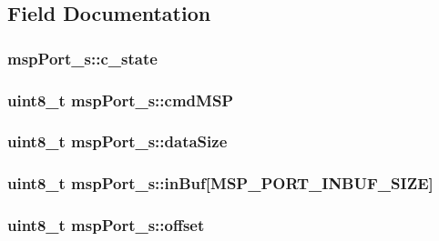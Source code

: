 \subsection{Field Documentation}
\hypertarget{structmspPort__s_aec5dc10b05ca82165f879c4191bd38a0}{
\subsubsection[{c\+\_\+state}]{ msp\+Port\+\_\+s\+::c\+\_\+state}}\label{structmspPort__s_aec5dc10b05ca82165f879c4191bd38a0}
\hypertarget{structmspPort__s_a8ab638ef0b8106954eaaad5542d77f41}{
\subsubsection[{cmd\+M\+S\+P}]{\setlength{\rightskip}{0pt plus 5cm}uint8\+\_\+t msp\+Port\+\_\+s\+::cmd\+M\+S\+P}}\label{structmspPort__s_a8ab638ef0b8106954eaaad5542d77f41}
\hypertarget{structmspPort__s_a7efe988247e57e9d15ad44eaaf6895e4}{
\subsubsection[{data\+Size}]{\setlength{\rightskip}{0pt plus 5cm}uint8\+\_\+t msp\+Port\+\_\+s\+::data\+Size}}\label{structmspPort__s_a7efe988247e57e9d15ad44eaaf6895e4}
\hypertarget{structmspPort__s_ab1b861f2214f7c49dd1b4fbc6f4daf11}{
\subsubsection[{in\+Buf}]{\setlength{\rightskip}{0pt plus 5cm}uint8\+\_\+t msp\+Port\+\_\+s\+::in\+Buf\mbox{[}{\bf M\+S\+P\+\_\+\+P\+O\+R\+T\+\_\+\+I\+N\+B\+U\+F\+\_\+\+S\+I\+Z\+E}\mbox{]}}}\label{structmspPort__s_ab1b861f2214f7c49dd1b4fbc6f4daf11}
\hypertarget{structmspPort__s_ad854fa5f09a8e9e9fba287179d8fa033}{
\subsubsection[{offset}]{\setlength{\rightskip}{0pt plus 5cm}uint8\+\_\+t msp\+Port\+\_\+s\+::offset}}\label{structmspPort__s_ad854fa5f09a8e9e9fba287179d8fa033}
